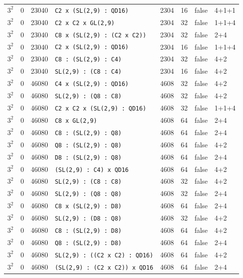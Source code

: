 \begin{longtable}{llrlrrll}
$3^2$ & 0 & 23040 & \texttt{C2 x (SL(2,9) : QD16)} & 2304 & 16 & false & 4+1+1\\
$3^2$ & 0 & 23040 & \texttt{C2 x C2 x GL(2,9)} & 2304 & 32 & false & 1+1+4\\
$3^2$ & 0 & 23040 & \texttt{C8 x (SL(2,9) : (C2 x C2))} & 2304 & 32 & false & 2+4\\
$3^2$ & 0 & 23040 & \texttt{C2 x (SL(2,9) : QD16)} & 2304 & 16 & false & 1+1+4\\
$3^2$ & 0 & 23040 & \texttt{C8 : (SL(2,9) : C4)} & 2304 & 32 & false & 4+2\\
$3^2$ & 0 & 23040 & \texttt{SL(2,9) : (C8 : C4)} & 2304 & 16 & false & 4+2\\
$3^2$ & 0 & 46080 & \texttt{C4 x (SL(2,9) : QD16)} & 4608 & 32 & false & 4+2\\
$3^2$ & 0 & 46080 & \texttt{SL(2,9) : (Q8 : C8)} & 4608 & 32 & false & 4+2\\
$3^2$ & 0 & 46080 & \texttt{C2 x C2 x (SL(2,9) : QD16)} & 4608 & 32 & false & 1+1+4\\
$3^2$ & 0 & 46080 & \texttt{C8 x GL(2,9)} & 4608 & 64 & false & 2+4\\
$3^2$ & 0 & 46080 & \texttt{C8 : (SL(2,9) : Q8)} & 4608 & 64 & false & 2+4\\
$3^2$ & 0 & 46080 & \texttt{Q8 : (SL(2,9) : Q8)} & 4608 & 64 & false & 4+2\\
$3^2$ & 0 & 46080 & \texttt{D8 : (SL(2,9) : Q8)} & 4608 & 64 & false & 2+4\\
$3^2$ & 0 & 46080 & \texttt{(SL(2,9) : C4) x QD16} & 4608 & 64 & false & 4+2\\
$3^2$ & 0 & 46080 & \texttt{SL(2,9) : (C8 : C8)} & 4608 & 32 & false & 4+2\\
$3^2$ & 0 & 46080 & \texttt{SL(2,9) : (Q8 : Q8)} & 4608 & 32 & false & 2+4\\
$3^2$ & 0 & 46080 & \texttt{C8 x (SL(2,9) : D8)} & 4608 & 64 & false & 2+4\\
$3^2$ & 0 & 46080 & \texttt{SL(2,9) : (D8 : Q8)} & 4608 & 32 & false & 4+2\\
$3^2$ & 0 & 46080 & \texttt{C8 : (SL(2,9) : D8)} & 4608 & 64 & false & 4+2\\
$3^2$ & 0 & 46080 & \texttt{Q8 : (SL(2,9) : D8)} & 4608 & 64 & false & 2+4\\
$3^2$ & 0 & 46080 & \texttt{SL(2,9) : ((C2 x C2) : QD16)} & 4608 & 64 & false & 4+2\\
$3^2$ & 0 & 46080 & \texttt{(SL(2,9) : (C2 x C2)) x QD16} & 4608 & 64 & false & 2+4\\

\end{longtable}
